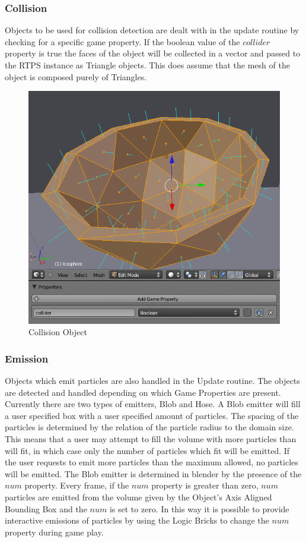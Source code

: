 \subsubsection{Collision}
Objects to be used for collision detection are dealt with in the update routine
by checking for a specific game property. If the boolean value of the
$collider$ property is true the faces of the object will be collected in a
vector and passed to the RTPS instance as Triangle objects. This does assume
that the mesh of the object is composed purely of Triangles. 
\begin{figure}[!htc]
 		\centering
		\includegraphics[scale=0.6]{figures/collision_ui.png}
        \caption{ Collision Object }
		\label{fig:collision_ui}
\end{figure}


\subsubsection{Emission}
Objects which emit particles are also handled in the Update routine. The
objects are detected and handled depending on which Game Properties are
present. Currently there are two types of emitters, Blob and Hose. A Blob
emitter will fill a user specified box with a user specified amount of
particles. The spacing of the particles is determined by the relation of the
particle radius to the domain size. This means that a user may attempt to fill
the volume with more particles than will fit, in which case only the number of
particles which fit will be emitted. If the user requests to emit more
particles than the maximum allowed, no particles will be emitted.
The Blob emitter is determined in blender by the presence of the $num$
property. Every frame, if the $num$ property is greater than zero, $num$
particles are emitted from the volume given by the Object's Axis Aligned
Bounding Box and the $num$ is set to zero. In this way it is possible to
provide interactive emissions of particles by using the Logic Bricks to change
the $num$ property during game play.

